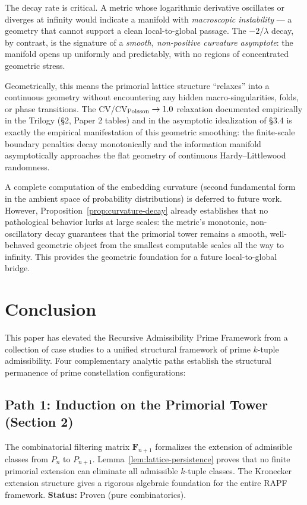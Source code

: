 \documentclass[11pt]{article}
\theoremstyle{remark}
\begin{document}
The decay rate is critical. A metric whose logarithmic derivative
oscillates or diverges at infinity would indicate a manifold with
\emph{macroscopic instability} --- a geometry that cannot support a clean
local-to-global passage. The $-2/\lambda$ decay, by contrast, is the
signature of a \emph{smooth, non-positive curvature asymptote}: the
manifold opens up uniformly and predictably, with no regions of
concentrated geometric stress.

Geometrically, this means the primorial lattice structure ``relaxes''
into a continuous geometry without encountering any hidden macro-singularities,
folds, or phase transitions. The CV/CV$_{\rm Poisson} \to 1.0$ relaxation
documented empirically in the Trilogy (\S{}2, Paper 2 tables) and in the
asymptotic idealization of \S{}3.4 is exactly the empirical manifestation
of this geometric smoothing: the finite-scale boundary penalties decay
monotonically and the information manifold asymptotically approaches the
flat geometry of continuous Hardy--Littlewood randomness.

A complete computation of the embedding curvature (second fundamental
form in the ambient space of probability distributions) is deferred to
future work. However, Proposition~\ref{prop:curvature-decay} already
establishes that no pathological behavior lurks at large scales: the
metric's monotonic, non-oscillatory decay guarantees that the primorial tower
remains a smooth, well-behaved geometric object from the smallest
computable scales all the way to infinity. This provides the
geometric foundation for a future local-to-global bridge.

\section{Conclusion}
\label{sec:conclusion}

This paper has elevated the Recursive Admissibility Prime Framework from
a collection of case studies to a unified structural framework of prime $k$-tuple
admissibility. Four complementary analytic paths establish the
structural permanence of prime constellation configurations:

\subsection*{Path 1: Induction on the Primorial Tower (Section 2)}
The combinatorial filtering matrix $\mathbf{F}_{n+1}$ formalizes the
extension of admissible classes from $P_n$ to $P_{n+1}$. Lemma~\ref{lem:lattice-persistence}
proves that no finite primorial extension can eliminate all admissible
$k$-tuple classes. The Kronecker extension structure gives a rigorous
algebraic foundation for the entire RAPF framework.
\textbf{Status:} Proven (pure combinatorics).
\end{document}
